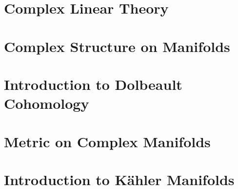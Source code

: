 \documentclass{article}
\begin{document}

\tableofcontents
\newpage

\section{Complex Linear Theory}

\section{Complex Structure on Manifolds}

\section{Introduction to Dolbeault Cohomology}

\section{Metric on Complex Manifolds}

\section{Introduction to K\"ahler Manifolds}
\end{document}
